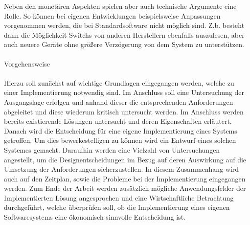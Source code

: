 Neben den monetären Aspekten spielen aber auch technische Argumente eine Rolle.
So können bei eigenen Entwicklungen beispielsweise Anpassungen vorgenommen werden, die bei Standardsoftware nicht möglich sind. Z.b. besteht dann die Möglichkeit Switchs von anderen Herstellern ebenfalls auszulesen, aber auch neuere Geräte ohne größere Verzögerung von dem System zu unterstützen.
\\
\\Vorgehensweise\\
\\
Hierzu soll zunächst auf wichtige Grundlagen eingegangen werden, welche zu einer Implementierung notwendig sind. Im Anschluss soll eine Untersuchung der Ausgangslage erfolgen und anhand dieser die entsprechenden Anforderungen abgeleitet und diese wiederum kritisch untersucht werden. Im Anschluss werden bereits existierende Lösungen untersucht und deren Eigenschaften erläutert. Danach wird die Entscheidung für eine eigene Implementierung eines Systems getroffen. Um dies bewerkestelligen zu können wird ein Entwurf eines solchen Systemes gemacht. Daraufhin werden eine Vielzahl von Untersuchungen angestellt, um die Designentscheidungen im Bezug auf deren Auswirkung auf die Umsetzung der Anforderungen sicherzustellen. In diesem Zusammenhang wird auch auf den Zeitplan, sowie die Probleme bei der Implementierung eingegangen werden.
Zum Ende der Arbeit werden zusätzlich mögliche Anwendungsfelder der Implementierten Lösung angesprochen und eine Wirtschaftliche Betrachtung durchgeführt, welche überprüfen soll, ob die Implementierung eines eigenen Softwaresystems eine ökonomisch sinnvolle Entscheidung ist.\\